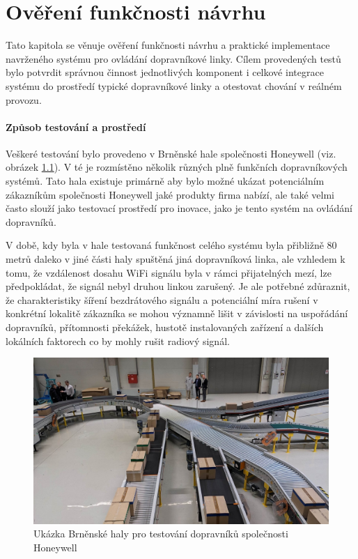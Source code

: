 \chapter{Ověření funkčnosti návrhu}
Tato kapitola se věnuje ověření funkčnosti návrhu a praktické implementace navrženého systému pro ovládání dopravníkové linky. Cílem provedených testů bylo potvrdit správnou činnost jednotlivých komponent i celkové integrace systému do prostředí typické dopravníkové linky a otestovat chování v reálném provozu.

\subsubsection{Způsob testování a prostředí}

Veškeré testování bylo provedeno v Brněnské hale společnosti Honeywell (viz. obrázek \ref{fig:BrnenskaHoneywellHala}). V té je rozmístěno několik různých plně funkčních dopravníkových systémů. Tato hala existuje primárně aby bylo možné ukázat potenciálním zákazníkům společnosti Honeywell jaké produkty firma nabízí, ale také velmi často slouží jako testovací prostředí pro inovace, jako je tento systém na ovládání dopravníků.

V době, kdy byla v hale testovaná funkčnost celého systému byla přibližně 80 metrů daleko v jiné části haly spuštěná jiná dopravníková linka, ale vzhledem k tomu, že vzdálenost dosahu WiFi signálu byla v rámci přijatelných mezí, lze předpokládat, že signál nebyl druhou linkou zarušený. Je ale potřebné zdůraznit, že charakteristiky šíření bezdrátového signálu a potenciální míra rušení v konkrétní lokalitě zákazníka se mohou významně lišit v závislosti na uspořádání dopravníků, přítomnosti překážek, hustotě instalovaných zařízení a dalších lokálních faktorech co by mohly rušit radiový signál.

\begin{figure}[hptb]
	\centering
	\includegraphics[width=1\linewidth]{images/BrnenskaHoneywellHala.png}
	\caption{Ukázka Brněnské haly pro testování dopravníků společnosti Honeywell \cite{HoneywellHala}}
	\label{fig:BrnenskaHoneywellHala}
\end{figure}

